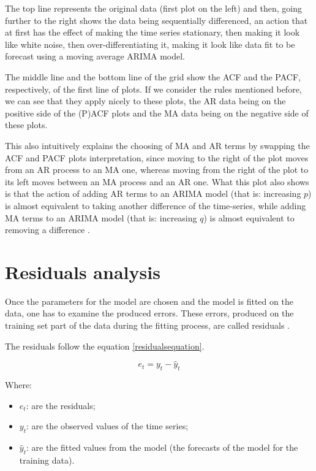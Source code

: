 \documentclass[12pt,a4paper,titlepage]{report}
\begin{document}
The top line represents the original data (first plot on the left) and then, going further to the right shows the data being sequentially differenced, an action that at first has the effect of making the time series stationary, then making it look like white noise, then over-differentiating it, making it look like data fit to be forecast using a moving average ARIMA model.

The middle line and the bottom line of the grid show the ACF and the PACF, respectively, of the first line of plots. If we consider the rules mentioned before, we can see that they apply nicely to these plots, the AR data being on the positive side of the (P)ACF plots and the MA data being on the negative side of these plots.

This also intuitively explains the choosing of MA and AR terms by swapping the ACF and PACF plots interpretation, since moving to the right of the plot moves from an AR process to an MA one, whereas moving from the right of the plot to its left moves between an MA process and an AR one. What this plot also shows is that the action of adding AR terms to an ARIMA model (that is: increasing $ p $) is almost equivalent to taking another difference of the time-series, while adding MA terms to an ARIMA model (that is: increasing $ q $) is almost equivalent to removing a difference \cite{nauarimaarmarules}.

\section{Residuals analysis}

Once the parameters for the model are chosen and the model is fitted on the data, one has to examine the produced errors. These errors, produced on the training set part of the data during the fitting process, are called residuals \cite{boxjenkins}.

The residuals follow the equation \ref{residualsequation}.

\begin{equation}
e_{t} = y_{t}-\hat{y}_{t}
\label{residualsequation}
\end{equation}

Where:
\begin{itemize}
    \item $ e_{t}$: are the residuals;
    \item $ y_{t}$: are the observed values of the time series;
    \item $ \hat{y}_{t}$: are the fitted values from the model (the forecasts of the model for the training data).
\end{itemize}
\end{document}

